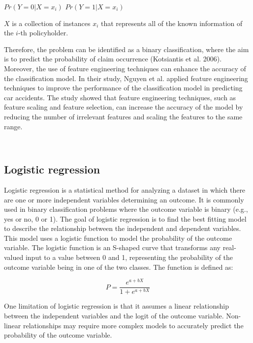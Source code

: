 \documentclass{IEEEtran}
\begin{document}
\begin{center}
    $Pr(Y = 0|X = x_i)$\hspace{1 cm} $Pr(Y = 1|X = x_i)$ \\
\end{center}



$X$ is a collection of instances $x_i$ that represents all of the known information of the $i$-th policyholder.

Therefore, the problem can be identified as a binary classification, where the aim is to predict the probability of claim occurrence (Kotsiantis et al. 2006). Moreover, the use of feature engineering techniques can enhance the accuracy of the classification model. In their study, Nguyen et al. applied feature engineering techniques to improve the performance of the classification model in predicting car accidents. The study showed that feature engineering techniques, such as feature scaling and feature selection, can increase the accuracy of the model by reducing the number of irrelevant features and scaling the features to the same range.

\

\subsection{Logistic regression}

Logistic regression is a statistical method for analyzing a dataset in which there are one or more independent variables determining an outcome. It is commonly used in binary classification problems where the outcome variable is binary (e.g., yes or no, 0 or 1). The goal of logistic regression is to find the best fitting model to describe the relationship between the independent and dependent variables. This model uses a logistic function to model the probability of the outcome variable. The logistic function is an S-shaped curve that transforms any real-valued input to a value between 0 and 1, representing the probability of the outcome variable being in one of the two classes. The function is defined as:

\begin{equation}
P=\frac{e^{a+b X}}{1+e^{a+b X}}
\end{equation}

One limitation of logistic regression is that it assumes a linear relationship between the independent variables and the logit of the outcome variable. Non-linear relationships may require more complex models to accurately predict the probability of the outcome variable.
\end{document}
